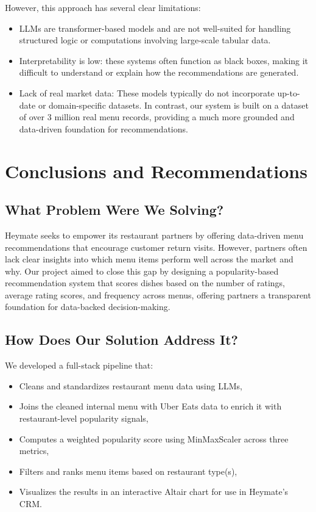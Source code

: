 \documentclass[
  11pt,
  a4paper,
  DIV=11,
  numbers=noendperiod]{scrartcl}
\providecommand{\tightlist}{%
  \setlength{\itemsep}{0pt}\setlength{\parskip}{0pt}}\usepackage{longtable,booktabs,array}
\begin{document}
However, this approach has several clear limitations:

\begin{itemize}
\tightlist
\item
  LLMs are transformer-based models and are not well-suited for handling
  structured logic or computations involving large-scale tabular data.
\item
  Interpretability is low: these systems often function as black boxes,
  making it difficult to understand or explain how the recommendations
  are generated.
\item
  Lack of real market data: These models typically do not incorporate
  up-to-date or domain-specific datasets. In contrast, our system is
  built on a dataset of over 3 million real menu records, providing a
  much more grounded and data-driven foundation for recommendations.
\end{itemize}

\section{Conclusions and
Recommendations}\label{conclusions-and-recommendations}

\subsection{What Problem Were We
Solving?}\label{what-problem-were-we-solving}

Heymate seeks to empower its restaurant partners by offering data-driven
menu recommendations that encourage customer return visits. However,
partners often lack clear insights into which menu items perform well
across the market and why. Our project aimed to close this gap by
designing a popularity-based recommendation system that scores dishes
based on the number of ratings, average rating scores, and frequency
across menus, offering partners a transparent foundation for data-backed
decision-making.

\subsection{How Does Our Solution Address
It?}\label{how-does-our-solution-address-it}

We developed a full-stack pipeline that:

\begin{itemize}
\tightlist
\item
  Cleans and standardizes restaurant menu data using LLMs,
\item
  Joins the cleaned internal menu with Uber Eats data to enrich it with
  restaurant-level popularity signals,
\item
  Computes a weighted popularity score using MinMaxScaler across three
  metrics,
\item
  Filters and ranks menu items based on restaurant type(s),
\item
  Visualizes the results in an interactive Altair chart for use in
  Heymate's CRM.
\end{itemize}
\end{document}
